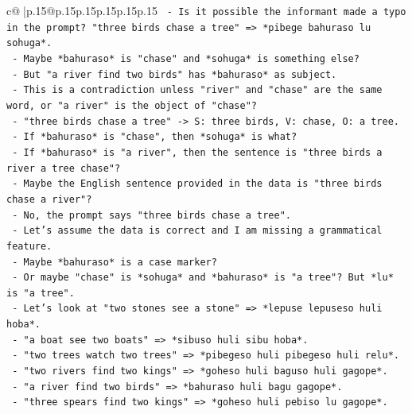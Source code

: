 \documentclass{article}
\begin{document}
{\begin{supertabular}{c@{$\;$}|p{.15\linewidth}@{}p{.15\linewidth}p{.15\linewidth}p{.15\linewidth}p{.15\linewidth}p{.15\linewidth}}
{{{\texttt{                        {-} Is it possible the informant made a typo in the prompt? "three birds chase a tree" => *pibege bahuraso lu sohuga*.} \\
\texttt{                        {-} Maybe *bahuraso* is "chase" and *sohuga* is something else?} \\
\texttt{                        {-} But "a river find two birds" has *bahuraso* as subject.} \\
\texttt{                        {-} This is a contradiction unless "river" and "chase" are the same word, or "a river" is the object of "chase"?} \\
\texttt{                        {-} "three birds chase a tree" {-}> S: three birds, V: chase, O: a tree.} \\
\texttt{                        {-} If *bahuraso* is "chase", then *sohuga* is what?} \\
\texttt{                        {-} If *bahuraso* is "a river", then the sentence is "three birds a river a tree chase"?} \\
\texttt{                        {-} Maybe the English sentence provided in the data is "three birds chase a river"?} \\
\texttt{                        {-} No, the prompt says "three birds chase a tree".} \\
\texttt{                        {-} Let's assume the data is correct and I am missing a grammatical feature.} \\
\texttt{                        {-} Maybe *bahuraso* is a case marker?} \\
\texttt{                        {-} Or maybe "chase" is *sohuga* and *bahuraso* is "a tree"? But *lu* is "a tree".} \\
\texttt{                        {-} Let's look at "two stones see a stone" => *lepuse lepuseso huli hoba*.} \\
\texttt{                        {-} "a boat see two boats" => *sibuso huli sibu hoba*.} \\
\texttt{                        {-} "two trees watch two trees" => *pibegeso huli pibegeso huli relu*.} \\
\texttt{                        {-} "two rivers find two kings" => *goheso huli baguso huli gagope*.} \\
\texttt{                        {-} "a river find two birds" => *bahuraso huli bagu gagope*.} \\
\texttt{                        {-} "three spears find two kings" => *goheso huli pebiso lu gagope*.} \\
}}}
\end{supertabular}}
\end{document}
